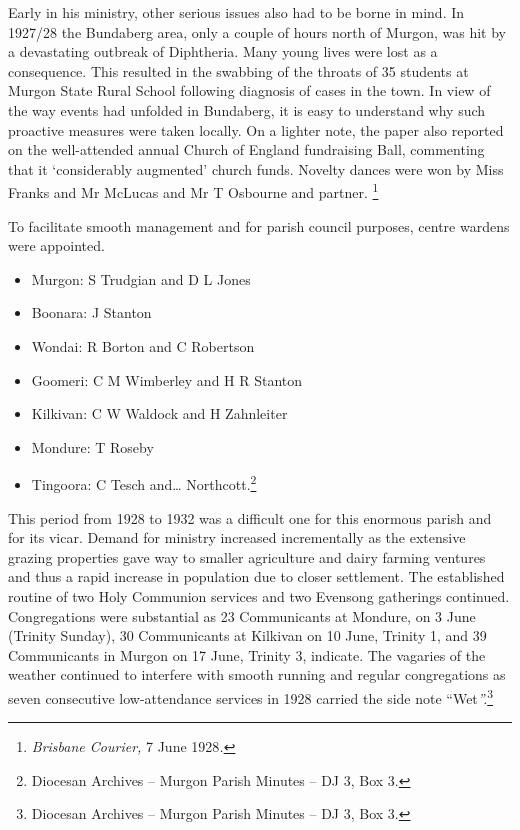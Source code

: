 Early in his ministry, other serious issues also had to be borne in
mind. In 1927/28 the Bundaberg area, only a couple of hours north of
Murgon, was hit by a devastating outbreak of Diphtheria. Many young
lives were lost as a consequence. This resulted in the swabbing of the
throats of 35 students at Murgon State Rural School following diagnosis
of cases in the town. In view of the way events had unfolded in
Bundaberg, it is easy to understand why such proactive measures were
taken locally. On a lighter note, the paper also reported on the
well-attended annual Church of England fundraising Ball, commenting that
it `considerably augmented' church funds. Novelty dances were won by
Miss Franks and Mr McLucas and Mr T Osbourne and partner. \footnote{\emph{Brisbane
  Courier,} 7 June 1928\emph{.}}

To facilitate smooth management and for parish council purposes, centre
wardens were appointed.

\begin{itemize}
\item
  Murgon: S Trudgian and D L Jones
\item
  Boonara: J Stanton
\item
  Wondai: R Borton and C Robertson
\item
  Goomeri: C M Wimberley and H R Stanton
\item
  Kilkivan: C W Waldock and H Zahnleiter
\item
  Mondure: T Roseby
\item
  Tingoora: C Tesch and\ldots{} Northcott.\footnote{Diocesan Archives --
    Murgon Parish Minutes -- DJ 3, Box 3.}
\end{itemize}

This period from 1928 to 1932 was a difficult one for this enormous
parish and for its vicar. Demand for ministry increased incrementally as
the extensive grazing properties gave way to smaller agriculture and
dairy farming ventures and thus a rapid increase in population due to
closer settlement. The established routine of two Holy Communion
services and two Evensong gatherings continued. Congregations were
substantial as 23 Communicants at Mondure, on 3 June (Trinity Sunday),
30 Communicants at Kilkivan on 10 June, Trinity 1, and 39 Communicants
in Murgon on 17 June, Trinity 3, indicate. The vagaries of the weather
continued to interfere with smooth running and regular congregations as
seven consecutive low-attendance services in 1928 carried the side note
``Wet\emph{''.}\footnote{Diocesan Archives -- Murgon Parish Minutes --
  DJ 3, Box 3.}

